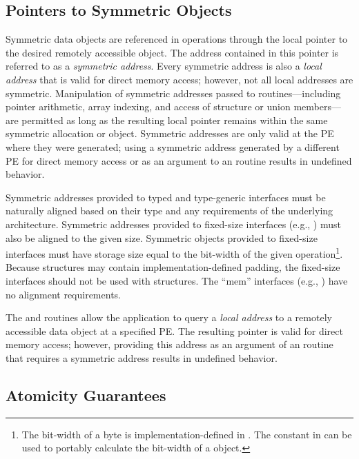 \subsection{Pointers to Symmetric Objects}\label{subsec:pointers_to_symmetric_objects}

Symmetric data objects are referenced in \openshmem operations through the
local pointer to the desired remotely accessible object.  The address contained
in this pointer is referred to as a {\em symmetric address}.  Every symmetric
address is also a {\em local address} that is valid for direct memory access;
however, not all local addresses are symmetric.  Manipulation of symmetric
addresses passed to \openshmem routines---including pointer arithmetic,
array indexing, and access of structure or union members---are permitted as long as
the resulting local pointer remains within the same symmetric allocation or
object.  Symmetric addresses are only valid at the \ac{PE} where they were
generated; using a symmetric address generated by a different \ac{PE} for
direct memory access or as an argument to an \openshmem routine results
in undefined behavior.

Symmetric addresses provided to typed and type-generic \openshmem interfaces
must be naturally aligned based on their type and any requirements of the
underlying architecture.  Symmetric addresses provided to fixed-size \openshmem
interfaces (e.g., ) must also be aligned to the given
size.  Symmetric objects provided to fixed-size \openshmem interfaces
must have storage size equal to the bit-width of the given
operation\footnote{The bit-width of a byte is implementation-defined in \Cstd.  The
 constant in  can be used to portably
calculate the bit-width of a \Cstd object.}.  Because \CorCpp{} structures may
contain implementation-defined padding, the fixed-size interfaces should not be
used with \CorCpp{} structures.
The ``mem'' interfaces (e.g., ) have no alignment
requirements.

The  and  routines allow the application to query a {\em local
address} to a remotely accessible data object at a specified \ac{PE}.  The
resulting pointer is valid for direct memory access; however, providing this
address as an argument of an \openshmem routine that requires a symmetric
address results in undefined behavior.

\subsection{Atomicity Guarantees}\label{subsec:amo_guarantees}

